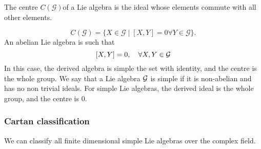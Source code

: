 The centre $C(\mathcal{G})$of a Lie algebra is the ideal whose elements commute with all other elements. 

\[ 
	C(\mathcal{G}) = \{ X \in \mathcal{G} \mid [X, Y] = 0 \forall Y \in \mathcal{G} \}.  
\]  An abelian Lie algebra is such that 
\[
	 [X, Y]= 0, \quad \forall X, Y \in \mathcal{ G }
\] In this case, the derived algebra is simple the set with identity, and the centre is the whole group. We say that a Lie algebra $\mathcal{ G }$ is simple if it is non-abelian and has no non trivial ideals. For simple Lie algebras, the derived ideal is the whole group, and the centre is 0. 

\subsubsection{Cartan classification} 
We can classify all finite dimensional simple Lie algebras over the complex field. 

